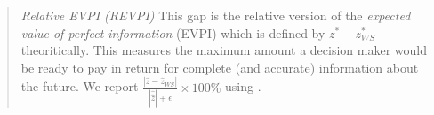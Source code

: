%


\begin{quote}
\noindent\textit{Relative EVPI (REVPI)} This gap is the relative version of the \textit{expected value of perfect information} (EVPI) which is defined by $z^*-z^*_{WS}$ theoritically. This measures the maximum amount a decision maker would be ready to pay in return for complete (and accurate) information about the future. We report $\frac{|\hat{z}-\hat{z}_{WS}|}{|\hat{\hat{z}}|+\epsilon}\times 100\%$ using \cplex.
\end{quote}


